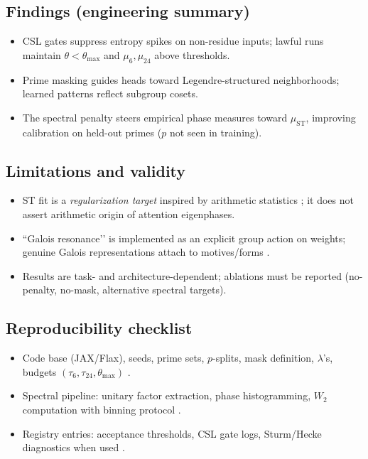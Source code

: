 \documentclass[12pt]{amsart}
\theoremstyle{plain}
\begin{document}
\subsection{Findings (engineering summary)}
\begin{itemize}[noitemsep]
  \item CSL gates suppress entropy spikes on non-residue inputs; lawful runs maintain $\theta<\theta_{\max}$ and $\mu_6,\mu_{24}$ above thresholds.
  \item Prime masking guides heads toward Legendre-structured neighborhoods; learned patterns reflect subgroup cosets.
  \item The spectral penalty steers empirical phase measures toward $\mu_{\mathrm{ST}}$, improving calibration on held-out primes ($p$ not seen in training).
\end{itemize}

\subsection{Limitations and validity}
\begin{itemize}[noitemsep]
  \item ST fit is a \emph{regularization target} inspired by arithmetic statistics \cite{katz1999random}; it does not assert arithmetic origin of attention eigenphases.
  \item “Galois resonance’’ is implemented as an explicit group action on weights; genuine Galois representations attach to motives/forms \cite{deligne1971formes,harris2001geometry}.
  \item Results are task- and architecture-dependent; ablations must be reported (no-penalty, no-mask, alternative spectral targets).
\end{itemize}

\subsection{Reproducibility checklist}
\begin{itemize}[noitemsep]
  \item Code base (JAX/Flax), seeds, prime sets, $p$-splits, mask definition, $\lambda$’s, budgets $(\tau_6,\tau_{24},\theta_{\max})$ \cite{bradbury2018jax,vaswani2017attention}.
  \item Spectral pipeline: unitary factor extraction, phase histogramming, $W_2$ computation with binning protocol \cite{villani2009optimal}.
  \item Registry entries: acceptance thresholds, CSL gate logs, Sturm/Hecke diagnostics when used \cite{sturm1987congruence,diamond2005first}.
\end{itemize}
\end{document}
